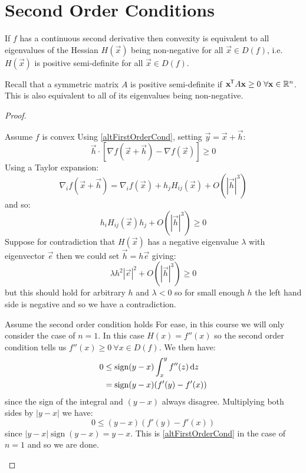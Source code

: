 \documentclass[../main.tex]{subfiles}
\begin{document}
\section{Second Order Conditions}
\begin{theorem}
  If $f$ has a continuous second derivative then convexity is equivalent to all eigenvalues of the Hessian $H(\vec{x})$ being non-negative for all $\vec{x} \in D(f)$, i.e. $H(\vec{x})$ is positive semi-definite for all $\vec{x} \in D(f)$. \label{2ndOrderConvexity}
\end{theorem}
\begin{remark}[Recap]
  Recall that a symmetric matrix $A$ is positive semi-definite if $\mathbf{\bm{x}}^{{\mkern-1.5mu\mathsf{T}}} A \mathbf{\bm{x}} \geq 0\ \forall \mathbf{\bm{x}} \in \mathbb{R}^{n}$. This is also equivalent to all of its eigenvalues being non-negative.
\end{remark}
\begin{proof}
  \begin{proofdirection}{Assume $f$ is convex}
    Using \cref{altFirstOrderCond}, setting $\vec{y} = \vec{x} + \vec{h}$:
    \[
      \vec{h} \cdot [\nabla f(\vec{x} + \vec{h}) - \nabla f(\vec{x})] \geq 0
    \]
    Using a Taylor expansion:
    \[
      \nabla_i f(\vec{x} + \vec{h}) = \nabla_i f(\vec{x}) + h_j H_{i j}(\vec{x}) + O(|\vec{h}|^3)
    \]
    and so:
    \[
      h_i H_{i j}(\vec{x}) h_j + O(|\vec{h}|^3) \geq 0
    \]
    Suppose for contradiction that $H(\vec{x})$ has a negative eigenvalue $\lambda$ with eigenvector $\vec{e}$ then we could set $\vec{h} = h \vec{e}$ giving:
    \[
      \lambda h^2 |\vec{e}|^2 + O(|\vec{h}|^3) \geq 0
    \]
    but this should hold for arbitrary $h$ and $\lambda < 0$ so for small enough $h$ the left hand side is negative and so we have a contradiction.
  \end{proofdirection}
  \begin{proofdirection}{Assume the second order condition holds}
    For ease, in this course we will only consider the case of $n = 1$.
    In this case $H(x) = f''(x)$ so the second order condition tells us $f''(x) \geq 0\ \forall x \in D(f)$.
    We then have:
    \begin{align*}
      0 &\leq \operatorname{sign}(y - x) \int_{x}^{y} f''(z) \d{z} \\
        &= \operatorname{sign}(y - x) (f'(y) - f'(x))
    \end{align*}
    since the sign of the integral and $(y - x)$ always disagree.
    Multiplying both sides by $|y - x|$ we have:
    \[
      0 \leq (y - x)(f'(y) - f'(x))
    \]
    since $|y - x| \operatorname{sign}(y - x) = y - x$.
    This is \cref{altFirstOrderCond} in the case of $n = 1$ and so we are done.
  \end{proofdirection}
\end{proof}
\end{document}

